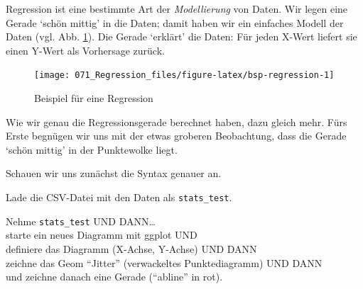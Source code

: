 \documentclass[12pt,ngerman,]{book}
\makeatletter
\newenvironment{Shaded}{\begin{snugshade}}{\end{snugshade}}
\newcommand{\KeywordTok}[1]{\textcolor[rgb]{0.13,0.29,0.53}{\textbf{#1}}}
\newcommand{\DataTypeTok}[1]{\textcolor[rgb]{0.13,0.29,0.53}{#1}}
\newcommand{\DecValTok}[1]{\textcolor[rgb]{0.00,0.00,0.81}{#1}}
\newcommand{\FloatTok}[1]{\textcolor[rgb]{0.00,0.00,0.81}{#1}}
\newcommand{\StringTok}[1]{\textcolor[rgb]{0.31,0.60,0.02}{#1}}
\newcommand{\OperatorTok}[1]{\textcolor[rgb]{0.81,0.36,0.00}{\textbf{#1}}}
\newcommand{\NormalTok}[1]{#1}
\newenvironment{kframe}{%
\medskip{}
\setlength{\fboxsep}{.8em}
 \def\at@end@of@kframe{}%
 \ifinner\ifhmode%
  \def\at@end@of@kframe{\end{minipage}}%
  \begin{minipage}{\columnwidth}%
 \fi\fi%
 \def\FrameCommand##1{\hskip\@totalleftmargin \hskip-\fboxsep
 \colorbox{shadecolor}{##1}\hskip-\fboxsep
     \hskip-\linewidth \hskip-\@totalleftmargin \hskip\columnwidth}%
 \MakeFramed {\advance\hsize-\width
   \@totalleftmargin\z@ \linewidth\hsize
   \@setminipage}}%
 {\par\unskip\endMakeFramed%
 \at@end@of@kframe}
\renewenvironment{Shaded}{\begin{kframe}}{\end{kframe}}
\theoremstyle{definition}
\theoremstyle{definition}
\theoremstyle{remark}
\let\BeginKnitrBlock\begin \let\EndKnitrBlock\end
\makeatother
\begin{document}
Regression ist eine bestimmte Art der
\emph{Modellierung} von Daten. Wir legen eine Gerade `schön mittig' in
die Daten; damit haben wir ein einfaches Modell der Daten (vgl. Abb.
\ref{fig:bsp-regression}). Die Gerade `erklärt' die Daten: Für jeden
X-Wert liefert sie einen Y-Wert als Vorhersage zurück.

\begin{Shaded}
\end{Shaded}

\begin{figure}

{\centering \texttt{[image: 071\_Regression\_files/figure-latex/bsp-regression-1]} 

}

\caption{Beispiel für eine Regression}\label{fig:bsp-regression}
\end{figure}

Wie wir genau die Regressionsgerade berechnet haben, dazu gleich mehr.
Fürs Erste begnügen wir uns mit der etwas groberen Beobachtung, dass die
Gerade `schön mittig' in der Punktewolke liegt.

Schauen wir uns zunächst die Syntax genauer an.

\BeginKnitrBlock{rmdpseudocode}
Lade die CSV-Datei mit den Daten als \texttt{stats\_test}.

Nehme \texttt{stats\_test} UND DANN\ldots{}\\
starte ein neues Diagramm mit ggplot UND\\
definiere das Diagramm (X-Achse, Y-Achse) UND DANN\\
zeichne das Geom ``Jitter'' (verwackeltes Punktediagramm) UND DANN\\
und zeichne danach eine Gerade (``abline'' in rot).
\EndKnitrBlock{rmdpseudocode}
\end{document}
